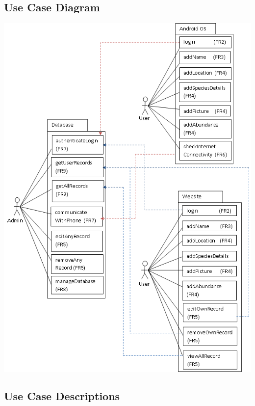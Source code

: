 \subsection{Use Case Diagram}
	\includegraphics[scale=0.8]{useCases/useCase.png}
\subsection{Use Case Descriptions}

